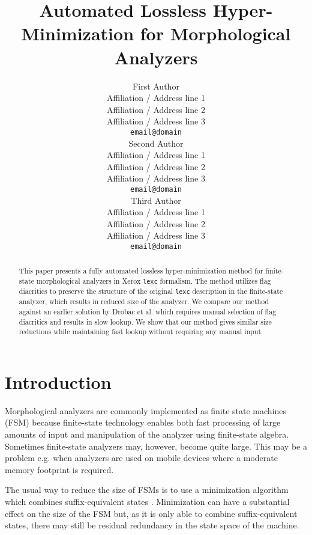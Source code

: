 \documentclass[11pt]{article}
\title{Automated Lossless Hyper-Minimization for Morphological Analyzers}
\author{First Author \\
  Affiliation / Address line 1 \\
  Affiliation / Address line 2 \\
  Affiliation / Address line 3 \\
  {\tt email@domain} \\\And
  Second Author \\
  Affiliation / Address line 1 \\
  Affiliation / Address line 2 \\
  Affiliation / Address line 3 \\
  {\tt email@domain} \\\And
  Third Author \\
  Affiliation / Address line 1 \\
  Affiliation / Address line 2 \\
  Affiliation / Address line 3 \\
  {\tt email@domain} \\}
\date{}
\begin{document}
\maketitle
\begin{abstract}
  This paper presents a fully automated lossless hyper-minimization
  method for finite-state morphological analyzers in Xerox {\tt lexc}
  formalism. The method utilizes flag diacritics to preserve the
  structure of the original {\tt lexc} description in the finite-state
  analyzer, which results in reduced size of the analyzer. We compare
  our method against an earlier solution by Drobac et al.  which
  requires manual selection of flag diacritics and results in slow
  lookup. We show that our method gives similar size reductions while
  maintaining fast lookup without requiring any manual input.

\end{abstract}

\section{Introduction}

Morphological analyzers are commonly implemented as finite state
machines (FSM) because finite-state technology enables both fast
processing of large amounts of input and manipulation of the analyzer
using finite-state algebra. Sometimes finite-state analyzers may,
however, become quite large. This may be a problem e.g. when analyzers are
used on mobile devices where a moderate memory footprint is required.
 

The usual way to reduce the size of FSMs is to use a minimization
algorithm which combines suffix-equivalent states
\cite{Aho1986}. Minimization can have a substantial effect on the size
of the FSM but, as it is only able to combine suffix-equivalent
states, there may still be residual redundancy in the state space of the
machine.
\end{document}
